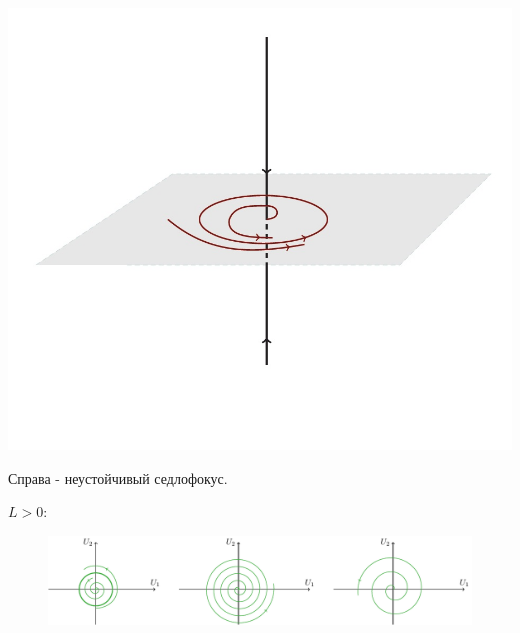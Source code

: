 \begin{center}
\begin{minipage}{0.3\linewidth}
        \includegraphics[width=\linewidth]{fig/55_3.jpg} 
        \vspace{-50pt}
        \label{fig:1}
    \end{minipage}    
\end{center}

Справа - неустойчивый седлофокус.

$L>0:$
\begin{figure}[H]
	\centering
	\includegraphics[width=1\linewidth]{fig/fig58.pdf}   
\end{figure}

